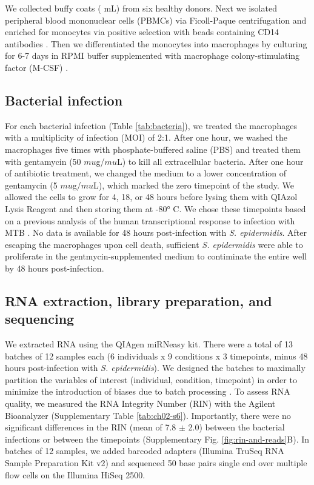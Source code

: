 We collected buffy coats ( mL) from six healthy
donors. Next we isolated peripheral blood mononuclear cells (PBMCs) via
Ficoll-Paque centrifugation \citep{Rivero-Lezcano2012} and enriched for
monocytes via positive selection with beads containing CD14 antibodies
\citep{Barreiro2012}. Then we differentiated the monocytes into
macrophages by culturing for 6-7 days in RPMI buffer supplemented with
macrophage colony-stimulating factor (M-CSF) \citep{Tailleux2003}.

\subsection{Bacterial infection}\label{bacterial-infection}

For each bacterial infection (Table \ref{tab:bacteria}), we treated the macrophages with
a multiplicity of infection (MOI) of 2:1. After one hour, we washed the
macrophages five times with phosphate-buffered saline (PBS) and treated
them with gentamycin (50 $mu$g/$mu$L) to kill all extracellular bacteria.
After one hour of antibiotic treatment, we changed the medium to a lower
concentration of gentamycin (5 $mu$g/$mu$L), which marked the zero timepoint
of the study. We allowed the cells to grow for 4, 18, or 48 hours before
lysing them with QIAzol Lysis Reagent and then storing them at -80° C.
We chose these timepoints based on a previous analysis of the human
transcriptional response to infection with MTB \citep{Tailleux2008}. No
data is available for 48 hours post-infection with \emph{S.
epidermidis}. After escaping the macrophages upon cell death, sufficient
\emph{S. epidermidis} were able to proliferate in the
gentmycin-supplemented medium to contiminate the entire well by 48 hours
post-infection.

\subsection{RNA extraction, library preparation, and
sequencing}\label{rna-extraction-library-preparation-and-sequencing}

We extracted RNA using the QIAgen miRNeasy kit. There were a total of 13
batches of 12 samples each (6 individuals x 9 conditions x 3 timepoints,
minus 48 hours post-infection with \emph{S. epidermidis}). We designed
the batches to maximally partition the variables of interest
(individual, condition, timepoint) in order to minimize the introduction
of biases due to batch processing \citep{Auer2010}. To assess RNA
quality, we measured the RNA Integrity Number (RIN) with the Agilent
Bioanalyzer (Supplementary Table \ref{tab:ch02-s6}). Importantly, there were no
significant differences in the RIN (mean of 7.8 $\pm$ 2.0) between the
bacterial infections or between the timepoints (Supplementary Fig. \ref{fig:rin-and-reads}B). In batches of 12 samples, we added barcoded adapters (Illumina
TruSeq RNA Sample Preparation Kit v2) and sequenced 50 base pairs single
end over multiple flow cells on the Illumina HiSeq 2500.

